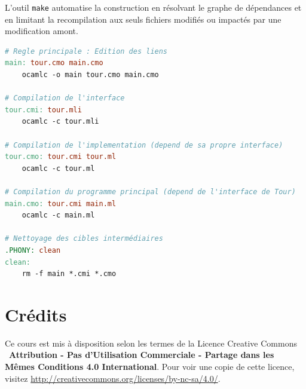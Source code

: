 \documentclass{article}
\begin{document}
L'outil \texttt{make} automatise la construction en résolvant le graphe de dépendances et en limitant la recompilation aux seuls fichiers modifiés ou impactés par une modification amont.


\begin{lstlisting}[language=make]
# Regle principale : Edition des liens
main: tour.cmo main.cmo
	ocamlc -o main tour.cmo main.cmo

# Compilation de l'interface
tour.cmi: tour.mli
	ocamlc -c tour.mli

# Compilation de l'implementation (depend de sa propre interface)
tour.cmo: tour.cmi tour.ml
	ocamlc -c tour.ml

# Compilation du programme principal (depend de l'interface de Tour)
main.cmo: tour.cmi main.ml
	ocamlc -c main.ml

# Nettoyage des cibles intermédiaires
.PHONY: clean
clean:
	rm -f main *.cmi *.cmo
\end{lstlisting}

\newpage
\tableofcontents

\section*{Crédits}
Ce cours est mis à disposition selon les termes de la Licence Creative Commons \ccbyncsa\ \textbf{Attribution - Pas d'Utilisation Commerciale - Partage dans les Mêmes Conditions 4.0 International}. 
Pour voir une copie de cette licence, visitez \url{http://creativecommons.org/licenses/by-nc-sa/4.0/}.
\end{document}
